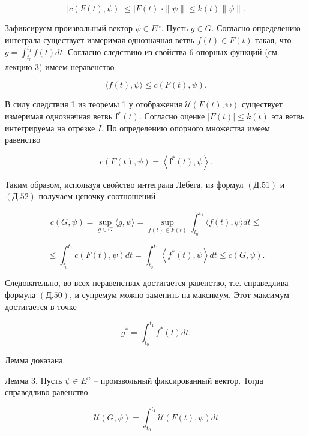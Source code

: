 \documentclass[8pt]{extarticle}
\begin{document}
\[
\left| {c\left( {F\left( t\right),\psi}\right)}\right| \leq \left| {F\left( t\right)}\right|\cdot\parallel\psi\parallel \leq k\left( t\right)\parallel\psi\parallel .
\]

Зафиксируем произвольный вектор \(\psi \in {E}^{n}\). Пусть \(g \in G\). Согласно определению интеграла существует измеримая однозначная ветвь \(f\left( t\right) \in F\left( t\right)\) такая, что \(g = {\int }_{{t}_{0}}^{{t}_{1}}f\left( t\right) {dt}\). Согласно следствию из свойства 6 опорных функций (см. лекцию 3) имеем неравенство

\[
\langle f\left( t\right),\psi\rangle \leq c\left( {F\left( t\right),\psi}\right). \tag{Д.51}
\]

В силу следствия 1 из теоремы 1 у отображения \(\mathcal{U}\left( {F\left( t\right),\mathbf{\psi}}\right)\) существует измеримая однозначная ветвь \({\mathbf{f}}^{ *}\left( t\right)\). Согласно оценке \(\left| {F\left( t\right)}\right| \leq k\left( t\right)\) эта ветвь интегрируема на отрезке \(I\). По определению опорного множества имеем равенство

\[
c\left( {F\left( t\right),\psi}\right) = \left\langle {{\mathbf{f}}^{ *}\left( t\right),\psi}\right\rangle . \tag{Д.52}
\]

Таким образом, используя свойство интеграла Лебега, из формул \((Д.51)\) и \((Д.52)\) получаем цепочку соотношений

\[
c\left( {G,\psi}\right) = \mathop{\sup }\limits_{{g \in G}}\langle g,\psi\rangle
= \mathop{\sup }\limits_{{f\left( t\right) \in F\left( t\right)}}{\int }_{{t}_{0}}^{{t}_{1}}\langle f\left( t\right),\psi\rangle {dt} \leq
\]

\[
\leq {\int }_{{t}_{0}}^{{t}_{1}}c\left( {F\left( t\right),\psi}\right) {dt}
= {\int }_{{t}_{0}}^{{t}_{1}}\left\langle {{f}^{ *}\left( t\right),\psi}\right\rangle {dt}
\leq c\left( {G,\psi}\right).
\]

Следовательно, во всех неравенствах достигается равенство, т.е. справедлива формула \((Д.50)\), и супремум можно заменить на максимум. Этот максимум достигается в точке

\[
{g}^{ *} = {\int }_{{t}_{0}}^{{t}_{1}}{f}^{ *}\left( t\right) {dt}.
\]

Лемма доказана.

\iffalse

Лемма 3. Пусть \(\psi \in {E}^{n}\) -- произвольный фиксированный вектор. Тогда справедливо равенство

\[
\mathcal{U}\left( {G,\psi }\right)  = {\int }_{{t}_{0}}^{{t}_{1}}\mathcal{U}\left( {F\left( t\right) ,\psi }\right) {dt} \tag{II.53}
\]
\end{document}
